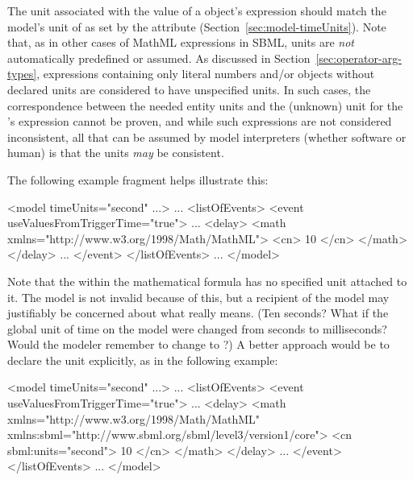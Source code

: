 The unit associated with the value of a \Delay object's
 expression should match the model's unit of
 as set by the \Model attribute 
(Section~\ref{sec:model-timeUnits}).  Note that, as in other cases
of MathML expressions in SBML, units are \emph{not} automatically
predefined or assumed.  As discussed in
Section~\ref{sec:operator-arg-types}, expressions containing only
literal numbers and/or \Parameter objects without declared units
are considered to have unspecified units.  In such cases, the
correspondence between the needed entity units and the (unknown)
unit for the \Delay's  expression cannot be proven,
and while such expressions are not considered inconsistent, all
that can be assumed by model interpreters (whether software or
human) is that the units \emph{may} be consistent.

The following \Event example fragment helps illustrate this:
\label{sec:event:delay:example}

\begin{example}
<model timeUnits="second" ...>
    ...
    <listOfEvents>
        <event useValuesFromTriggerTime="true">
            ...
            <delay>
                <math xmlns="http://www.w3.org/1998/Math/MathML">
                    <cn> 10 </cn>
                </math>
            </delay>
            ...
        </event>
    </listOfEvents>
    ...
</model>
\end{example}

Note that the  within the mathematical formula
has no specified unit attached to it.  The model is not invalid
because of this, but a recipient of the model may justifiably be
concerned about what  really means.  (Ten seconds?  What
if the global unit of time on the model were changed from seconds
to milliseconds?  Would the modeler remember to change  to
?)  A better approach would be to declare the unit
explicitly, as in the following example:

\begin{example}
<model timeUnits="second" ...>
    ...
    <listOfEvents>
        <event useValuesFromTriggerTime="true">
            ...
            <delay>
                <math xmlns="http://www.w3.org/1998/Math/MathML"
                      xmlns:sbml="http://www.sbml.org/sbml/level3/version1/core">
                    <cn sbml:units="second"> 10 </cn>
                </math>
            </delay>
            ...
        </event>
    </listOfEvents>
    ...
</model>
\end{example}

